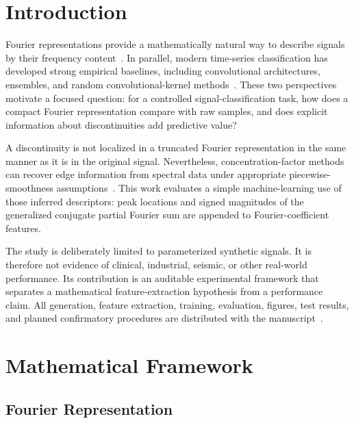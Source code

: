 \documentclass[mathematics,article,submit,moreauthors,pdftex]{mdpi}
\begin{document}
\maketitle

\section{Introduction}

Fourier representations provide a mathematically natural way to describe signals by their frequency content~\cite{stein2003fourier,oppenheim2010dsp}. In parallel, modern time-series classification has developed strong empirical baselines, including convolutional architectures, ensembles, and random convolutional-kernel methods~\cite{bagnall2017bakeoff,fawaz2019review,fawaz2020inceptiontime,dempster2020rocket}. These two perspectives motivate a focused question: for a controlled signal-classification task, how does a compact Fourier representation compare with raw samples, and does explicit information about discontinuities add predictive value?

A discontinuity is not localized in a truncated Fourier representation in the same manner as it is in the original signal. Nevertheless, concentration-factor methods can recover edge information from spectral data under appropriate piecewise-smoothness assumptions~\cite{gelb1999edges,gelb2000nonlinear}. This work evaluates a simple machine-learning use of those inferred descriptors: peak locations and signed magnitudes of the generalized conjugate partial Fourier sum are appended to Fourier-coefficient features.

The study is deliberately limited to parameterized synthetic signals. It is therefore not evidence of clinical, industrial, seismic, or other real-world performance. Its contribution is an auditable experimental framework that separates a mathematical feature-extraction hypothesis from a performance claim. All generation, feature extraction, training, evaluation, figures, test results, and planned confirmatory procedures are distributed with the manuscript~\cite{srour2026code}.

\section{Mathematical Framework}

\subsection{Fourier Representation}
\end{document}
